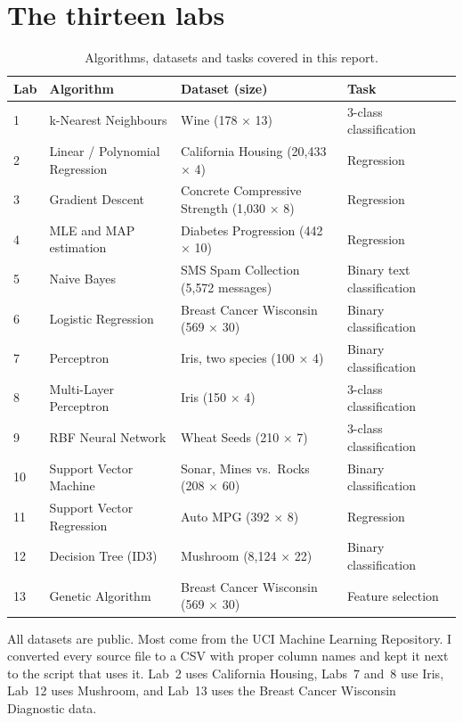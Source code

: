 \section*{The thirteen labs}

\begin{table}[H]
\centering\small
\caption{Algorithms, datasets and tasks covered in this report.}
\label{tab:overview}
\begin{tabularx}{\linewidth}{@{}l l >{\raggedright\arraybackslash}X l@{}}
\textbf{Lab} & \textbf{Algorithm} & \textbf{Dataset (size)} & \textbf{Task} \\
\midrule
1  & k-Nearest Neighbours         & Wine (178 × 13)                          & 3-class classification \\
2  & Linear / Polynomial Regression & California Housing (20{,}433 × 4)       & Regression \\
3  & Gradient Descent             & Concrete Compressive Strength (1{,}030 × 8) & Regression \\
4  & MLE and MAP estimation       & Diabetes Progression (442 × 10)          & Regression \\
5  & Naive Bayes                  & SMS Spam Collection (5{,}572 messages)   & Binary text classification \\
6  & Logistic Regression          & Breast Cancer Wisconsin (569 × 30)       & Binary classification \\
7  & Perceptron                   & Iris, two species (100 × 4)              & Binary classification \\
8  & Multi-Layer Perceptron       & Iris (150 × 4)                            & 3-class classification \\
9  & RBF Neural Network            & Wheat Seeds (210 × 7)                    & 3-class classification \\
10 & Support Vector Machine       & Sonar, Mines vs.\ Rocks (208 × 60)       & Binary classification \\
11 & Support Vector Regression    & Auto MPG (392 × 8)                       & Regression \\
12 & Decision Tree (ID3)          & Mushroom (8{,}124 × 22)                  & Binary classification \\
13 & Genetic Algorithm            & Breast Cancer Wisconsin (569 × 30)       & Feature selection \\
\bottomrule
\end{tabularx}
\end{table}
All datasets are public. Most come from the UCI Machine Learning Repository. I converted every source
file to a CSV with proper column names and kept it next to the script that uses it. Lab~2 uses California
Housing, Labs~7 and~8 use Iris, Lab~12 uses Mushroom, and Lab~13 uses the Breast Cancer Wisconsin
Diagnostic data.

